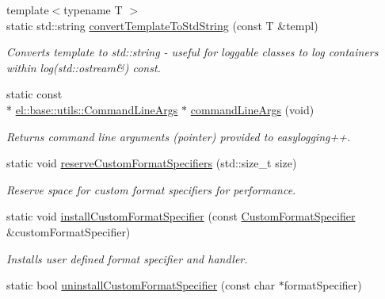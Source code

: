 \begin{DoxyCompactItemize}
\item 
\hypertarget{classel_1_1Helpers_a8b032e32cd042ddc4fef4e814bad1082}{{\footnotesize template$<$typename T $>$ }\\static std\-::string \hyperlink{classel_1_1Helpers_a8b032e32cd042ddc4fef4e814bad1082}{convert\-Template\-To\-Std\-String} (const T \&templ)}\label{classel_1_1Helpers_a8b032e32cd042ddc4fef4e814bad1082}

\begin{DoxyCompactList}\small\item\em Converts template to std\-::string -\/ useful for loggable classes to log containers within log(std\-::ostream\&) const. \end{DoxyCompactList}\item 
\hypertarget{classel_1_1Helpers_a83bab44f77a4961f8f5231e7ce9917bb}{static const \\*
\hyperlink{classel_1_1base_1_1utils_1_1CommandLineArgs}{el\-::base\-::utils\-::\-Command\-Line\-Args} $\ast$ \hyperlink{classel_1_1Helpers_a83bab44f77a4961f8f5231e7ce9917bb}{command\-Line\-Args} (void)}\label{classel_1_1Helpers_a83bab44f77a4961f8f5231e7ce9917bb}

\begin{DoxyCompactList}\small\item\em Returns command line arguments (pointer) provided to easylogging++. \end{DoxyCompactList}\item 
static void \hyperlink{classel_1_1Helpers_afb5fb896f3222fb8c628a51a05d72c32}{reserve\-Custom\-Format\-Specifiers} (std\-::size\-\_\-t size)
\begin{DoxyCompactList}\small\item\em Reserve space for custom format specifiers for performance. \end{DoxyCompactList}\item 
\hypertarget{classel_1_1Helpers_aa6de15a09db4f2a6763a6652c0ea12b1}{static void \hyperlink{classel_1_1Helpers_aa6de15a09db4f2a6763a6652c0ea12b1}{install\-Custom\-Format\-Specifier} (const \hyperlink{classel_1_1CustomFormatSpecifier}{Custom\-Format\-Specifier} \&custom\-Format\-Specifier)}\label{classel_1_1Helpers_aa6de15a09db4f2a6763a6652c0ea12b1}

\begin{DoxyCompactList}\small\item\em Installs user defined format specifier and handler. \end{DoxyCompactList}\item 
\hypertarget{classel_1_1Helpers_a23ec73819c25758d604d149ad0c6b73f}{static bool \hyperlink{classel_1_1Helpers_a23ec73819c25758d604d149ad0c6b73f}{uninstall\-Custom\-Format\-Specifier} (const char $\ast$format\-Specifier)}\label{classel_1_1Helpers_a23ec73819c25758d604d149ad0c6b73f}


\end{DoxyCompactItemize}
